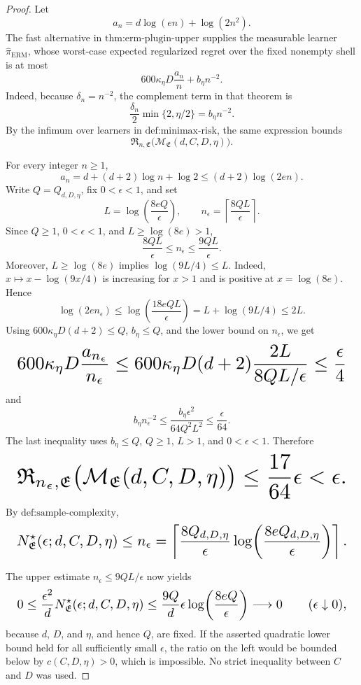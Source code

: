 \documentclass{article}
\begin{document}
\begin{proof}
Let
\[
a_n=d\log(en)+\log(2n^2).
\]
The fast alternative in \(\text{thm:erm-plugin-upper}\) supplies the measurable learner \(\widehat\pi_{\mathrm{ERM}}\), whose worst-case expected regularized regret over the fixed nonempty shell is at most
\[
600\kappa_\eta D\frac{a_n}{n}+b_\eta n^{-2}.
\]
Indeed, because \(\delta_n=n^{-2}\), the complement term in that theorem is
\[
\frac{\delta_n}{2}\min\{2,\eta/2\}=b_\eta n^{-2}.
\]
By the infimum over learners in \(\text{def:minimax-risk}\), the same expression bounds
\[
\mathfrak R_{n,\mathfrak E}\bigl(\mathcal M_{\mathfrak E}(d,C,D,\eta)\bigr).
\]

For every integer \(n\ge1\),
\[
a_n=d+(d+2)\log n+\log2
\le(d+2)\log(2en).
\]
Write \(Q=Q_{d,D,\eta}\), fix \(0<\epsilon<1\), and set
\[
L=\log\!\left(\frac{8eQ}{\epsilon}\right),
\qquad
n_\epsilon=\left\lceil\frac{8QL}{\epsilon}\right\rceil.
\]
Since \(Q\ge1\), \(0<\epsilon<1\), and \(L\ge\log(8e)>1\),
\[
\frac{8QL}{\epsilon}\le n_\epsilon\le\frac{9QL}{\epsilon}.
\]
Moreover, \(L\ge\log(8e)\) implies \(\log(9L/4)\le L\). Indeed, \(x\mapsto x-\log(9x/4)\) is increasing for \(x>1\) and is positive at \(x=\log(8e)\). Hence
\[
\log(2en_\epsilon)
\le\log\!\left(\frac{18eQL}{\epsilon}\right)
=L+\log(9L/4)
\le2L.
\]
Using \(600\kappa_\eta D(d+2)\le Q\), \(b_\eta\le Q\), and the lower bound on \(n_\epsilon\), we get
\[
\makebox[\linewidth][c]{\resizebox{0.98\linewidth}{!}{\(\displaystyle 600\kappa_\eta D\frac{a_{n_\epsilon}}{n_\epsilon}
\le
600\kappa_\eta D(d+2)\frac{2L}{8QL/\epsilon}
\le\frac\epsilon4\)}}
\]
and
\[
b_\eta n_\epsilon^{-2}
\le\frac{b_\eta\epsilon^2}{64Q^2L^2}
\le\frac\epsilon{64}.
\]
The last inequality uses \(b_\eta\le Q\), \(Q\ge1\), \(L>1\), and \(0<\epsilon<1\). Therefore
\[
\makebox[\linewidth][c]{\resizebox{0.98\linewidth}{!}{\(\displaystyle \mathfrak R_{n_\epsilon,\mathfrak E}
\bigl(\mathcal M_{\mathfrak E}(d,C,D,\eta)\bigr)
\le\frac{17}{64}\epsilon<\epsilon.\)}}
\]
By \(\text{def:sample-complexity}\),
\[
\makebox[\linewidth][c]{\resizebox{0.98\linewidth}{!}{\(\displaystyle N^\star_{\mathfrak E}(\epsilon;d,C,D,\eta)
\le n_\epsilon
=
\left\lceil\frac{8Q_{d,D,\eta}}{\epsilon}
\log\!\left(\frac{8eQ_{d,D,\eta}}{\epsilon}\right)\right\rceil.\)}}
\]

The upper estimate \(n_\epsilon\le9QL/\epsilon\) now yields
\[
\makebox[\linewidth][c]{\resizebox{0.98\linewidth}{!}{\(\displaystyle 0\le
\frac{\epsilon^2}{d}N^\star_{\mathfrak E}(\epsilon;d,C,D,\eta)
\le\frac{9Q}{d}\epsilon
\log\!\left(\frac{8eQ}{\epsilon}\right)
\longrightarrow0
\qquad(\epsilon\downarrow0),\)}}
\]
because \(d\), \(D\), and \(\eta\), and hence \(Q\), are fixed. If the asserted quadratic lower bound held for all sufficiently small \(\epsilon\), the ratio on the left would be bounded below by \(c(C,D,\eta)>0\), which is impossible. No strict inequality between \(C\) and \(D\) was used.
\end{proof}
\end{document}
